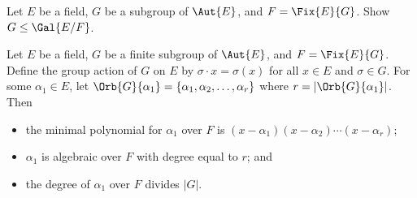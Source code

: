 \begin{exercise}\label{exercise-subgroup-of-Aut-E-is-subgroup-of-galois-group-of-fixed-field}
    Let $E$ be a field, $G$ be a subgroup of $\Aut{E}$, and $F = \Fix{E}{G}$. Show $G \leq \Gal{E/F}$.
\end{exercise}

\begin{theorem}\label{thrm-degree-of-element-under-fixed-field-action}
    Let $E$ be a field, $G$ be a finite subgroup of $\Aut{E}$, and $F = \Fix{E}{G}$. Define the group action of $G$ on $E$ by $\sigma \cdot x = \sigma(x)$ for all $x \in E$ and $\sigma \in G$. For some $\alpha_1 \in E$, let $\Orb{G}{\alpha_1} = \{\alpha_1, \alpha_2, \dots, \alpha_r\}$ where $r = |\Orb{G}{\alpha_1}|$. Then
    \begin{itemize}
        \item the minimal polynomial for $\alpha_1$ over $F$ is $(x-\alpha_1)(x-\alpha_2)\cdots(x-\alpha_r)$;
        \item $\alpha_1$ is algebraic over $F$ with degree equal to $r$; and
        \item the degree of $\alpha_1$ over $F$ divides $|G|$.
    \end{itemize}
\end{theorem}
